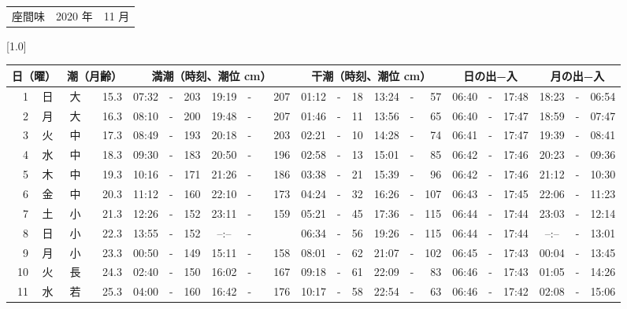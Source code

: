 \documentclass[12pt,a4j]{jsarticle}
\begin{document}
 \begin{table}[htbp]
 \begin{center}
 \begin{tabular}{lcc}
 \LARGE{座間味}  & \large{2020 年} & \large{11 月} \\
 \end{tabular}
 \end{center}
 \begin{center}
    \scalebox{0.7}[1.0]{
    \begin{tabular}{|rc|cr|ccrccr|ccrccr|ccc|ccc|}
    \hline
    \multicolumn{2}{|c|}{日（曜）} & \multicolumn{2}{c|}{潮（月齢）} & \multicolumn{6}{c|}{満潮（時刻、潮位 cm）} & \multicolumn{6}{c|}{干潮（時刻、潮位 cm）} & \multicolumn{3}{c|}{日の出−入} &  \multicolumn{3}{c|}{月の出−入}\\
 \hline
 1 & 日 & 大 & 15.3 &  07:32 &-& 203 &  19:19 &-& 207 &  01:12 &-&  18 &  13:24 &-&  57 & 06:40 & -& 17:48 & 18:23 & -& 06:54 \\
 2 & 月 & 大 & 16.3 &  08:10 &-& 200 &  19:48 &-& 207 &  01:46 &-&  11 &  13:56 &-&  65 & 06:40 & -& 17:47 & 18:59 & -& 07:47 \\
 3 & 火 & 中 & 17.3 &  08:49 &-& 193 &  20:18 &-& 203 &  02:21 &-&  10 &  14:28 &-&  74 & 06:41 & -& 17:47 & 19:39 & -& 08:41 \\
 4 & 水 & 中 & 18.3 &  09:30 &-& 183 &  20:50 &-& 196 &  02:58 &-&  13 &  15:01 &-&  85 & 06:42 & -& 17:46 & 20:23 & -& 09:36 \\
 5 & 木 & 中 & 19.3 &  10:16 &-& 171 &  21:26 &-& 186 &  03:38 &-&  21 &  15:39 &-&  96 & 06:42 & -& 17:46 & 21:12 & -& 10:30 \\
 6 & 金 & 中 & 20.3 &  11:12 &-& 160 &  22:10 &-& 173 &  04:24 &-&  32 &  16:26 &-& 107 & 06:43 & -& 17:45 & 22:06 & -& 11:23 \\
 7 & 土 & 小 & 21.3 &  12:26 &-& 152 &  23:11 &-& 159 &  05:21 &-&  45 &  17:36 &-& 115 & 06:44 & -& 17:44 & 23:03 & -& 12:14 \\
 8 & 日 & 小 & 22.3 &  13:55 &-& 152 &  --:-- &-&~~~~~ &  06:34 &-&  56 &  19:26 &-& 115 & 06:44 & -& 17:44 & --:-- & -& 13:01 \\
 9 & 月 & 小 & 23.3 &  00:50 &-& 149 &  15:11 &-& 158 &  08:01 &-&  62 &  21:07 &-& 102 & 06:45 & -& 17:43 & 00:04 & -& 13:45 \\
10 & 火 & 長 & 24.3 &  02:40 &-& 150 &  16:02 &-& 167 &  09:18 &-&  61 &  22:09 &-&  83 & 06:46 & -& 17:43 & 01:05 & -& 14:26 \\
11 & 水 & 若 & 25.3 &  04:00 &-& 160 &  16:42 &-& 176 &  10:17 &-&  58 &  22:54 &-&  63 & 06:46 & -& 17:42 & 02:08 & -& 15:06 \\

\end{tabular}}
\end{center}
\end{table}
\end{document}
